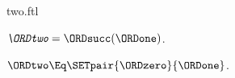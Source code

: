 \documentclass{stex}
\begin{document}
\begin{smodule}{two.ftl}

\begin{definition}[forthel,for=ORDtwo]
  $\emph{\ORDtwo} = \ORDsucc(\ORDone)$.
\end{definition}

\begin{proposition}[forthel]
  $\ORDtwo \Eq \SETpair{\ORDzero}{\ORDone}$.
\end{proposition}
\end{smodule}
\end{document}
